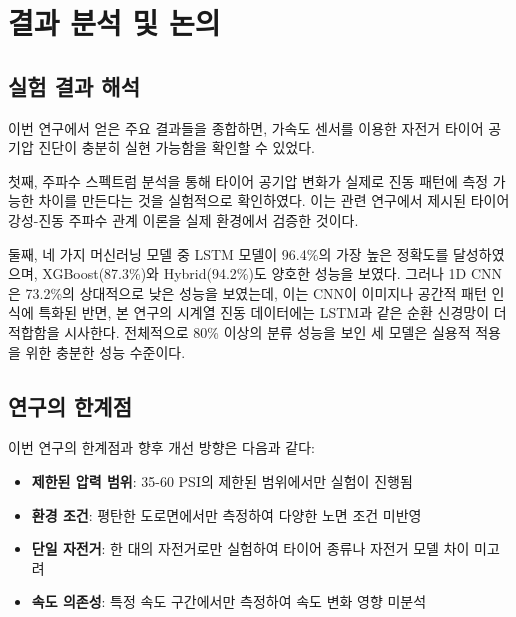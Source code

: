\documentclass[12pt,a4paper]{article}
\begin{document}

\section{결과 분석 및 논의}
\label{sec:discussion}

\subsection{실험 결과 해석}
\label{subsec:result_interpretation}

이번 연구에서 얻은 주요 결과들을 종합하면, 가속도 센서를 이용한 자전거 타이어 공기압 진단이 충분히 실현 가능함을 확인할 수 있었다. 

첫째, 주파수 스펙트럼 분석을 통해 타이어 공기압 변화가 실제로 진동 패턴에 측정 가능한 차이를 만든다는 것을 실험적으로 확인하였다. 이는 관련 연구에서 제시된 타이어 강성-진동 주파수 관계 이론을 실제 환경에서 검증한 것이다.

둘째, 네 가지 머신러닝 모델 중 LSTM 모델이 96.4\%의 가장 높은 정확도를 달성하였으며, XGBoost(87.3\%)와 Hybrid(94.2\%)도 양호한 성능을 보였다. 그러나 1D CNN은 73.2\%의 상대적으로 낮은 성능을 보였는데, 이는 CNN이 이미지나 공간적 패턴 인식에 특화된 반면, 본 연구의 시계열 진동 데이터에는 LSTM과 같은 순환 신경망이 더 적합함을 시사한다. 전체적으로 80\% 이상의 분류 성능을 보인 세 모델은 실용적 적용을 위한 충분한 성능 수준이다.

\subsection{연구의 한계점}
\label{subsec:limitations}

이번 연구의 한계점과 향후 개선 방향은 다음과 같다:

\begin{itemize}
    \item \textbf{제한된 압력 범위}: 35-60 PSI의 제한된 범위에서만 실험이 진행됨
    \item \textbf{환경 조건}: 평탄한 도로면에서만 측정하여 다양한 노면 조건 미반영
    \item \textbf{단일 자전거}: 한 대의 자전거로만 실험하여 타이어 종류나 자전거 모델 차이 미고려
    \item \textbf{속도 의존성}: 특정 속도 구간에서만 측정하여 속도 변화 영향 미분석
\end{itemize}

\end{document}
